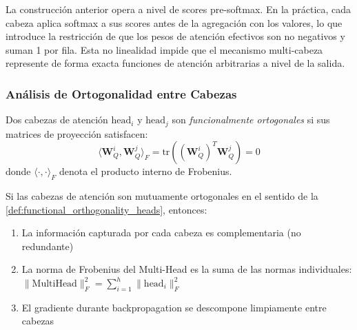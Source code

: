 \begin{remark}
La construcción anterior opera a nivel de scores pre-softmax. En la práctica, cada cabeza aplica softmax a sus scores antes de la agregación con los valores, lo que introduce la restricción de que los pesos de atención efectivos son no negativos y suman 1 por fila. Esta no linealidad impide que el mecanismo multi-cabeza represente de forma exacta funciones de atención arbitrarias a nivel de la salida.
\end{remark}

\subsubsection{Análisis de Ortogonalidad entre Cabezas}

\begin{definition}\label{def:functional_orthogonality_heads}
    Dos cabezas de atención $\text{head}_i$ y $\text{head}_j$ son \textit{funcionalmente ortogonales} si sus matrices de proyección satisfacen:
    \begin{equation}
        \langle \mathbf{W}_Q^i, \mathbf{W}_Q^j \rangle_F = \text{tr}((\mathbf{W}_Q^i)^T \mathbf{W}_Q^j) = 0
        \label{eq:head_orthogonality}
    \end{equation}
    donde $\langle \cdot, \cdot \rangle_F$ denota el producto interno de Frobenius.
\end{definition}

\begin{proposition}\label{prop:orthogonality_benefits}
    Si las cabezas de atención son mutuamente ortogonales en el sentido de la \autoref{def:functional_orthogonality_heads}, entonces:
    \begin{enumerate}
        \item La información capturada por cada cabeza es complementaria (no redundante)
        \item La norma de Frobenius del Multi-Head es la suma de las normas individuales: $\|\text{MultiHead}\|_F^2 = \sum_{i=1}^h \|\text{head}_i\|_F^2$
        \item El gradiente durante backpropagation se descompone limpiamente entre cabezas
    \end{enumerate}
\end{proposition}

